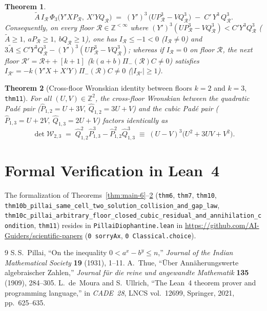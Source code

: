 \documentclass[11pt,a4paper]{article}
\theoremstyle{plain}
\newtheorem{theorem}{Theorem}[section]
\theoremstyle{definition}
\begin{document}
\begin{theorem}
\[
  \widetilde{A}\,I_{\mathcal{R}}\,\Phi_3\bigl(Y'X P_{\mathcal{R}},\ X'Y Q_{\mathcal{R}}\bigr)
  \;=\; (Y')^3\,\bigl(U P_{\mathcal{R}}^3 - V Q_{\mathcal{R}}^3\bigr) \;-\; C'\,Y^3\,Q_{\mathcal{R}}^3.
\]
Consequently, on every floor $\mathcal{R}\in\mathbb{Z}^{<\infty}$ where $(Y')^3(U P_{\mathcal{R}}^3 - V Q_{\mathcal{R}}^3) < C' Y^3 Q_{\mathcal{R}}^3$ ($\widetilde{A}\ge 1,\ a P_{\mathcal{R}}\ge 1,\ b Q_{\mathcal{R}}\ge 1$), one has $I_{\mathcal{R}} \le -1 < 0$ ($I_{\mathcal{R}}\ne 0$) and $3\widetilde{A} \le C' Y^3 Q_{\mathcal{R}}^3 - (Y')^3(U P_{\mathcal{R}}^3 - V Q_{\mathcal{R}}^3)$; whereas if $I_{\mathcal{R}} = 0$ on floor $\mathcal{R}$, the next floor $\mathcal{R}' = \mathcal{R}\mathbin{+\!+}[k+1]$ ($k(a+b)\Pi_-(\mathcal{R})C \ne 0$) satisfies $I_{\mathcal{R}'} = -k(Y'X + X'Y)\Pi_-(\mathcal{R})C \ne 0$ ($|I_{\mathcal{R}'}|\ge 1$).
\end{theorem}

\begin{theorem}[Cross-floor Wronskian identity between floors $k=2$ and $k=3$, \texttt{thm11}]
\label{thm:main-11}
For all $(U,V)\in\mathbb{Z}^2$, the cross-floor Wronskian between the quadratic Pad\'e pair ($\widehat{P}_{1,2}=U+3V,\ \widehat{Q}_{1,2}=3U+V$) and the cubic Pad\'e pair ($\widehat{P}_{1,3}=U+2V,\ \widehat{Q}_{1,3}=2U+V$) factors identically as
\begin{equation}
  \label{eq:cross-floor-wronskian}
  \det\mathcal{W}_{2,3} \;=\; \widehat{Q}_{1,2}^2\widehat{P}_{1,3}^3 - \widehat{P}_{1,2}^2\widehat{Q}_{1,3}^3 \;\equiv\; (U - V)^3\bigl(U^2 + 3UV + V^2\bigr).
\end{equation}
\end{theorem}

\section{Formal Verification in Lean~4}
\label{sec:lean4}

The formalization of Theorems~\ref{thm:main-6}--\ref{thm:main-11} (\texttt{thm6}, \texttt{thm7}, \texttt{thm10}, \texttt{thm10b\_pillai\_same\_cell\_two\_solution\_collision\_and\_gap\_law}, \texttt{thm10c\_pillai\_arbitrary\_floor\_closed\_cubic\_residual\_and\_annihilation\_condition}, \texttt{thm11}) resides in \texttt{PillaiDiophantine.lean} in \url{https://github.com/AI-Guiders/scientific-papers} (\texttt{0 sorryAx}, \texttt{0 Classical.choice}).

\begin{thebibliography}{9}
S.\,S.~Pillai, ``On the inequality $0 < a^x - b^y \le n$,'' \emph{Journal of the Indian Mathematical Society} \textbf{19} (1931), 1--11.
A.~Thue, ``\"Uber Ann\"aherungswerte algebraischer Zahlen,'' \emph{Journal f\"ur die reine und angewandte Mathematik} \textbf{135} (1909), 284--305.
L.~de~Moura and S.~Ullrich, ``The Lean~4 theorem prover and programming language,'' in \emph{CADE~28}, LNCS vol.~12699, Springer, 2021, pp.~625--635.
\end{thebibliography}
\end{document}
